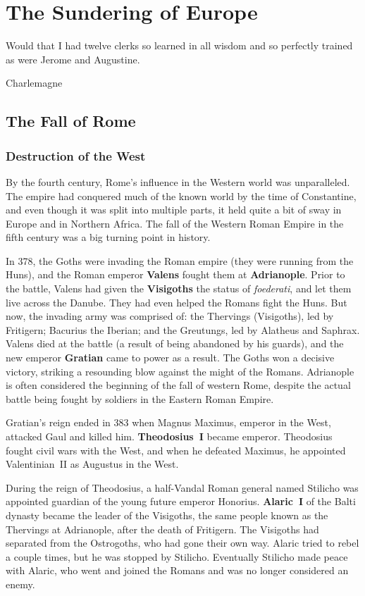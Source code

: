 \chapter{The Sundering of Europe}

\epigraph{%
  Would that I had twelve clerks so learned in all wisdom and so perfectly trained as were Jerome and Augustine.
}{Charlemagne}

\section{The Fall of Rome}

\subsection*{Destruction of the West}

By the fourth century, Rome's influence in the Western world was unparalleled.
The empire had conquered much of the known world by the time of Constantine,
and even though it was split into multiple parts, it held quite a bit of sway
in Europe and in Northern Africa.
The fall of the Western Roman Empire in the fifth century was a big turning point in history.

In 378, the Goths were invading the Roman empire (they were running from the Huns),
and the Roman emperor \textbf{Valens} fought them at \textbf{Adrianople}.
Prior to the battle, Valens had given the \textbf{Visigoths} the status of \textit{foederati},
and let them live across the Danube.
They had even helped the Romans fight the Huns.
But now, the invading army was comprised of:
the Thervings (Visigoths), led by Fritigern;
Bacurius the Iberian;
and the Greutungs, led by Alatheus and Saphrax.
Valens died at the battle (a result of being abandoned by his guards),
and the new emperor \textbf{Gratian} came to power as a result.
The Goths won a decisive victory, striking a resounding blow against the might of the Romans.
Adrianople is often considered the beginning of the fall of western Rome,
despite the actual battle being fought by soldiers in the Eastern Roman Empire.

Gratian's reign ended in 383 when Magnus Maximus, emperor in the West, attacked Gaul and killed him.
\textbf{Theodosius~I} became emperor.
Theodosius fought civil wars with the West,
and when he defeated Maximus, he appointed Valentinian~II as Augustus in the West.

During the reign of Theodosius, a half-Vandal Roman general named Stilicho
was appointed guardian of the young future emperor Honorius.
\textbf{Alaric~I} of the Balti dynasty became the leader of the Visigoths,
the same people known as the Thervings at Adrianople, after the death of Fritigern.
The Visigoths had separated from the Ostrogoths, who had gone their own way.
Alaric tried to rebel a couple times, but he was stopped by Stilicho.
Eventually Stilicho made peace with Alaric,
who went and joined the Romans and was no longer considered an enemy.

